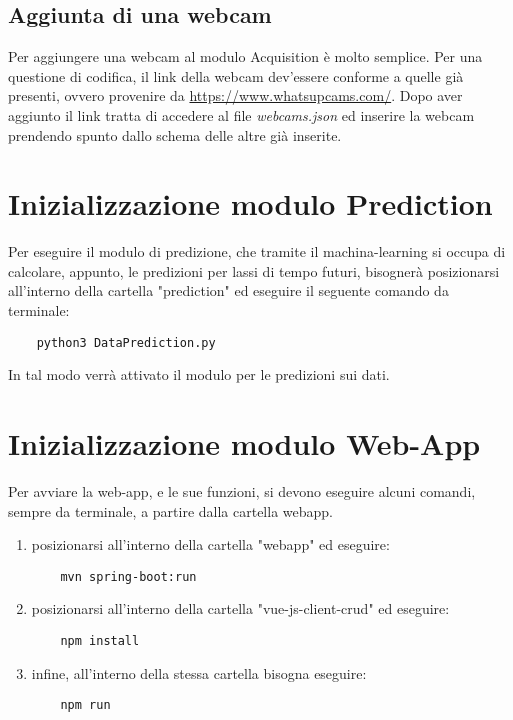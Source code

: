 \subsection{Aggiunta di una webcam}
Per aggiungere una webcam al modulo Acquisition è molto semplice.
Per una questione di codifica, il link della webcam dev'essere conforme a quelle già presenti, ovvero provenire da \url{https://www.whatsupcams.com/}.
Dopo aver aggiunto il link tratta di accedere al file \textit{webcams.json} ed inserire la webcam prendendo spunto dallo schema delle altre già inserite.


\section{Inizializzazione modulo Prediction}\label{ProceduraDiInstallazioneInizializzazioneModuloPrediction}
Per eseguire il modulo di predizione, che tramite il machina-learning si occupa di calcolare, appunto, le predizioni per lassi di tempo futuri, bisognerà posizionarsi all'interno della cartella "prediction" ed eseguire il seguente comando da terminale:

\begin{lstlisting}
    python3 DataPrediction.py
\end{lstlisting}
In tal modo verrà attivato il modulo per le predizioni sui dati.


\section{Inizializzazione modulo Web-App}\label{ProceduraDiInstallazioneInizializzazioneModuloWebApp}
Per avviare la web-app, e le sue funzioni, si devono eseguire alcuni comandi, sempre da terminale, a partire dalla cartella webapp.
\begin{enumerate}
  \item posizionarsi all'interno della cartella "webapp" ed eseguire:
  \begin{lstlisting}
    mvn spring-boot:run
  \end{lstlisting}
  \item posizionarsi all'interno della cartella "vue-js-client-crud" ed eseguire:
  \begin{lstlisting}
    npm install
  \end{lstlisting}
  \item infine, all'interno della stessa cartella bisogna eseguire:
  \begin{lstlisting}
    npm run
  \end{lstlisting}
\end{enumerate}
